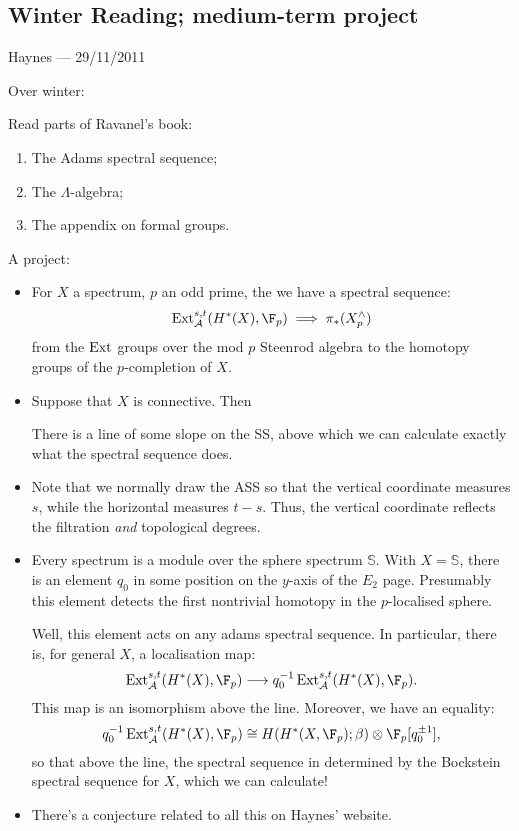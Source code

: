 \documentclass[11pt]{article}
\newcommand{\CONVERSATION}[3]{
\subsection*{#1}
\begin{flushright}
{\small #2 --- #3}
\end{flushright}
}
\begin{document}
\CONVERSATION{Winter Reading; medium-term project}{Haynes}{29/11/2011}
Over winter:
\begin{itemise}
\item Read parts of Ravanel's book:
\begin{enumerate}\squishlist
\item The Adams spectral sequence;
\item The $\Lambda$-algebra;
\item The appendix on formal groups.
\end{enumerate}
\item A project:
\begin{itemize}\squishlist
\item For $X$ a spectrum, $p$ an odd prime, the we have a spectral sequence:
\[\Ext^{s,t}_\calA(H^*(X),\F_p)\implies\pi_*(X^\wedge_p)\]
from the $\operatorname{Ext}$ groups over the mod $p$ Steenrod algebra to the homotopy groups of the $p$-completion of $X$.
\item Suppose that $X$ is connective. Then
\begin{thm*}
There is a line of some slope on the SS, above which we can calculate exactly what the spectral sequence does.
\end{thm*}
\item Note that we normally draw the ASS so that the vertical coordinate measures $s$, while the horizontal measures $t-s$. Thus, the vertical coordinate reflects the filtration \emph{and} topological degrees.
\item Every spectrum is a module over the sphere spectrum $\mathbb{S}$. With $X=\mathbb{S}$, there is an element $q_0$ in some position on the $y$-axis of the $E_2$ page. Presumably this element detects the first nontrivial homotopy in the $p$-localised sphere.

Well, this element acts on any adams spectral sequence. In particular, there is, for general $X$, a localisation map:
\[\Ext^{s,t}_\calA(H^*(X),\F_p)\to q_0^{-1}\Ext^{s,t}_\calA(H^*(X),\F_p).\]
This map is an isomorphism above the line. Moreover, we have an equality:
\[q_0^{-1}\Ext^{s,t}_\calA(H^*(X),\F_p)\cong H(H^*(X,\F_p);\beta)\otimes\F_p[q_0^{\pm1}],\]
so that above the line, the spectral sequence in determined by the Bockstein spectral sequence for $X$, which we can calculate!
\item There's a conjecture related to all this on Haynes' website.
\end{itemize}
\end{itemise}
\end{document}
